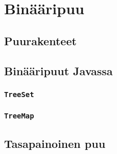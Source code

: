 \chapter{Binääripuu}

\section{Puurakenteet}

\section{Binääripuut Javassa}

\subsection{\texttt{TreeSet}}

\subsection{\texttt{TreeMap}}

\section{Tasapainoinen puu}
